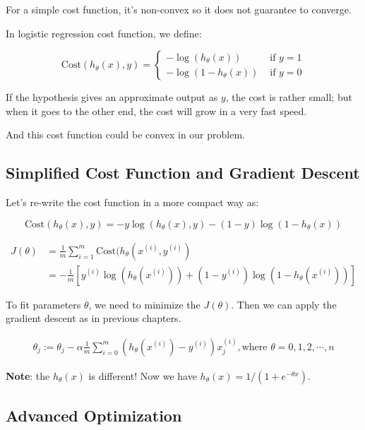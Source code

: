 \documentclass[black,simple]{../elegantbook}
\begin{document}
For a simple cost function, it's non-convex so it does not guarantee to converge.

In logistic regression cost function, we define:

\[
\text{Cost}\left(h_\theta(x), y\right) = \left\{
\begin{aligned}
    - \log (h_\theta(x)) & \text{ if } y = 1\\
    - \log (1 - h_\theta(x)) & \text{ if } y = 0
\end{aligned}    
\right.
\]

If the hypothesis gives an approximate output as \(y\), the cost is rather small; but when it goes to the other end, the cost will grow in a very fast speed.

And this cost function could be convex in our problem.

\subsection{Simplified Cost Function and Gradient Descent}

Let's re-write the cost function in a more compact way as: 

\[\text{Cost}\left(h_\theta(x), y\right) = -y \log (h_\theta(x), y) - (1-y) \log (1-h_\theta(x))\]

\[
\begin{aligned}
    J(\theta) &= \frac{1}{m} \sum_{i = 1}^m \text{Cost} (h_\theta(x^{(i)}, y^{(i)}) \\
    &=  -\frac{1}{m}\left[y^{(i)} \log (h_\theta(x^{(i)})) + (1-y^{(i)}) \log (1-h_\theta(x^{(i)}))\right]
\end{aligned}    
\]

To fit parameters \(\theta\), we need to minimize the \(J(\theta)\). Then we can apply the gradient descent as in previous chapters.


\[\begin{aligned}
    \theta_j := \theta_j - \alpha \frac{1}{m} \sum_{i = 0}^m (h_\theta(x^{(i)}) - y^{(i)})x_j^{(i)}, \text{where } \theta = 0, 1, 2, \cdots , n
\end{aligned}\]

\textbf{Note}: the \(h_\theta(x)\) is different! Now we have \(h_\theta(x) = 1 / (1 + e^{-\theta x})\).

\subsection{Advanced Optimization}
\end{document}
